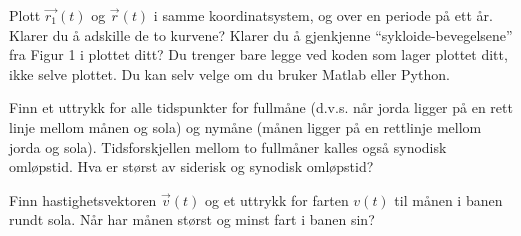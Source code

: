 \documentclass{../../myassignment}
\begin{document}
	\begin{problem}
		Plott $\vec{r_1}(t)$ og $\vec{r}(t)$ i samme koordinatsystem, og over en periode på ett år. Klarer du å adskille de to kurvene? Klarer du å gjenkjenne “sykloide-bevegelsene” fra Figur 1 i plottet ditt? Du trenger bare legge ved koden som lager plottet ditt, ikke selve plottet. Du kan selv velge om du bruker Matlab eller Python.
	\end{problem}

	\begin{problem}
		Finn et uttrykk for alle tidspunkter for fullmåne (d.v.s. når jorda ligger på en rett linje mellom månen og sola) og nymåne (månen ligger på en rettlinje mellom jorda og sola). Tidsforskjellen mellom to fullmåner kalles også synodisk omløpstid. Hva er størst av siderisk og synodisk omløpstid?	
	\end{problem}	

	\begin{problem}
		Finn hastighetsvektoren $\vec{v}(t)$ og et uttrykk for farten $v(t)$ til månen i banen rundt sola. Når har månen størst og minst fart i banen sin?
	\end{problem}
\end{document}
